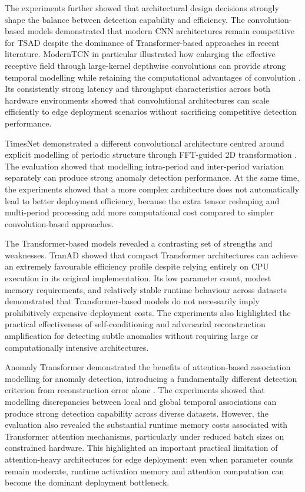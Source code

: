 \documentclass[twoside,11pt,openright]{report}
\begin{document}
The experiments further showed that architectural design decisions strongly shape
the balance between detection capability and efficiency. The convolution-based
models demonstrated that modern CNN architectures remain competitive for
TSAD despite the dominance of Transformer-based approaches in recent literature.
ModernTCN in particular illustrated how enlarging the effective receptive field
through large-kernel depthwise convolutions can provide strong temporal modelling
while retaining the computational advantages of convolution \citep{moderntcn2024}. Its consistently
strong latency and throughput characteristics across both hardware environments
showed that convolutional architectures can scale efficiently to edge deployment
scenarios without sacrificing competitive detection performance.

TimesNet demonstrated a different convolutional architecture centred around
explicit modelling of periodic structure through FFT-guided 2D transformation \citep{timesnet2023}.
The evaluation showed that modelling intra-period and inter-period variation
separately can produce strong anomaly detection performance. At the same time, 
the experiments showed that a more complex architecture does not automatically 
lead to better deployment efficiency, because the extra tensor reshaping and 
multi-period processing add more computational cost compared to simpler 
convolution-based approaches.

The Transformer-based models revealed a contrasting set of strengths and
weaknesses. TranAD \cite{tranad2022} showed that compact Transformer architectures can achieve an
extremely favourable efficiency profile despite relying entirely on CPU execution
in its original implementation. Its low parameter count, modest memory
requirements, and relatively stable runtime behaviour across datasets demonstrated
that Transformer-based models do not necessarily imply prohibitively expensive
deployment costs. The experiments also highlighted the practical effectiveness of
self-conditioning and adversarial reconstruction amplification for detecting
subtle anomalies without requiring large or computationally intensive
architectures.

Anomaly Transformer demonstrated the benefits of attention-based association
modelling for anomaly detection, introducing a fundamentally different detection
criterion from reconstruction error alone \citep{anomalytransformer2022}. 
The experiments showed that modelling
discrepancies between local and global temporal associations can produce strong
detection capability across diverse datasets. However, the evaluation also
revealed the substantial runtime memory costs associated with Transformer
attention mechanisms, particularly under reduced batch sizes on constrained
hardware. This highlighted an important practical limitation of attention-heavy
architectures for edge deployment: even when parameter counts remain moderate,
runtime activation memory and attention computation can become the dominant
deployment bottleneck.
\end{document}
